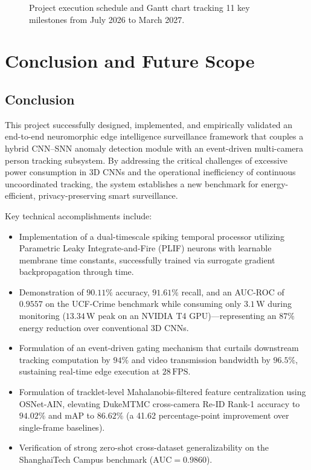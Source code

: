 \documentclass[12pt,a4paper]{report}
\begin{document}
\begin{figure}[H]
    \centering
    \caption{Project execution schedule and Gantt chart tracking 11 key milestones from July 2026 to March 2027.}
    \label{fig:project_gantt}
\end{figure}


\chapter{Conclusion and Future Scope}

\section{Conclusion}
This project successfully designed, implemented, and empirically validated an end-to-end neuromorphic edge intelligence surveillance framework that couples a hybrid CNN--SNN anomaly detection module with an event-driven multi-camera person tracking subsystem. By addressing the critical challenges of excessive power consumption in 3D CNNs and the operational inefficiency of continuous uncoordinated tracking, the system establishes a new benchmark for energy-efficient, privacy-preserving smart surveillance.

Key technical accomplishments include:
\begin{itemize}
    \item Implementation of a dual-timescale spiking temporal processor utilizing Parametric Leaky Integrate-and-Fire (PLIF) neurons with learnable membrane time constants, successfully trained via surrogate gradient backpropagation through time.
    \item Demonstration of $90.11\%$ accuracy, $91.61\%$ recall, and an AUC-ROC of $0.9557$ on the UCF-Crime benchmark while consuming only $3.1\,\text{W}$ during monitoring ($13.34\,\text{W}$ peak on an NVIDIA T4 GPU)---representing an $87\%$ energy reduction over conventional 3D CNNs.
    \item Formulation of an event-driven gating mechanism that curtails downstream tracking computation by $94\%$ and video transmission bandwidth by $96.5\%$, sustaining real-time edge execution at $28\,\text{FPS}$.
    \item Formulation of tracklet-level Mahalanobis-filtered feature centralization using OSNet-AIN, elevating DukeMTMC cross-camera Re-ID Rank-1 accuracy to $94.02\%$ and mAP to $86.62\%$ (a 41.62 percentage-point improvement over single-frame baselines).
    \item Verification of strong zero-shot cross-dataset generalizability on the ShanghaiTech Campus benchmark ($\text{AUC} = 0.9860$).
\end{itemize}
\end{document}
